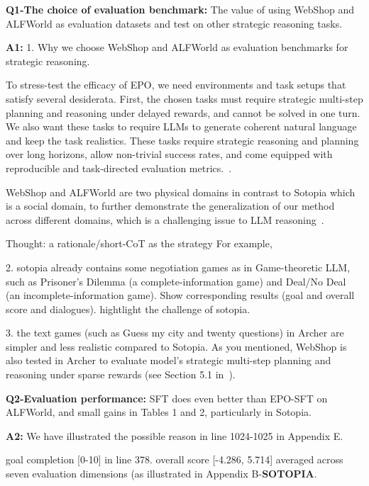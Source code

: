 \textbf{Q1-The choice of evaluation benchmark:} The value of using WebShop and ALFWorld as evaluation datasets and test on other strategic reasoning tasks. 

\textbf{A1:}
1. Why we choose WebShop and ALFWorld as evaluation benchmarks for strategic reasoning.

To stress-test the efficacy of EPO, we need environments and task setups that satisfy several
desiderata. First, the chosen tasks must require strategic multi-step planning and reasoning under
delayed rewards, and cannot be solved in one turn. We also want these tasks to require LLMs to
generate coherent natural language and keep the task realistics.
These tasks require strategic reasoning and planning over long horizons, allow non-trivial success rates, and come equipped with reproducible and task-directed evaluation metrics.~\cite{pmlr-v235-zhou24t}.

WebShop and ALFWorld are two physical domains in contrast to Sotopia which is a social domain, to further demonstrate the generalization of our method across different domains, which is a challenging issue to LLM reasoning~\cite{patil2025advancing}.


Thought: a rationale/short-CoT as the strategy
For example,



2. sotopia already contains some negotiation games as in Game-theoretic LLM, such as Prisoner's Dilemma (a complete-information game) and Deal/No Deal (an incomplete-information game).
Show corresponding results (goal and overall score and dialogues).
hightlight the challenge of sotopia.

3. the text games (such as Guess my city and twenty questions) in Archer are simpler and less realistic compared to Sotopia. As you mentioned, WebShop is also tested in Archer to evaluate model's strategic multi-step planning and reasoning under sparse rewards (see Section 5.1 in~\cite{pmlr-v235-zhou24t}).



\textbf{Q2-Evaluation performance:} SFT does even better than EPO-SFT on ALFWorld, and small gains in Tables 1 and 2, particularly in Sotopia.

\textbf{A2:}
We have illustrated the possible reason in line 1024-1025 in Appendix E.

goal completion [0-10] in line 378.
overall score [-4.286, 5.714] averaged across seven evaluation dimensions (as illustrated in Appendix B-\textbf{SOTOPIA}.

